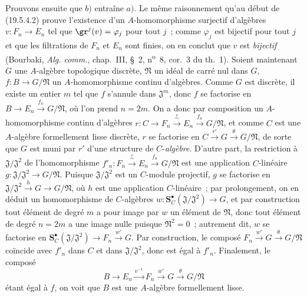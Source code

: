 \begin{env}[19.5.4.3]
\label{0.19.5.4.3-fr}
Prouvons ensuite que $b)$ entraîne $a)$. Le même raisonnement qu'au début de
(19.5.4.2) prouve l'existence d'un $A$-homomorphisme surjectif d'algèbres
$v:F_n\to E_n$ tel que $\gr^j(v)=\varphi_j$ pour tout $j$~; comme $\varphi_j$
est bijectif pour tout $j$ et que les filtrations de $F_n$ et $E_n$ sont
finies, on en conclut que $v$ est \emph{bijectif} (Bourbaki,
\emph{Alg. comm.}, chap.~III, §~2, n\textsuperscript{o}~8, cor.~3 du th.~1).
Soient maintenant $G$ une $A$-algèbre topologique discrète, $\mathfrak N$ un
idéal de carré nul dans $G$, $f:B\to G/\mathfrak N$ un $A$-homomorphisme
continu d'algèbres. Comme $G$ est discrète, il existe un entier $m$ tel que
$f$ s'annule dans $\mathfrak J^m$, donc $f$ se factorise en
$B\to E_n\xrightarrow{f_n}G/\mathfrak N$, où l'on prend $n=2m$. On a donc par
composition un $A$-homomorphisme continu d'algèbres
$r:C\to F_n\xrightarrow{\overset{v}{\sim}}E_n\xrightarrow{f_n}G/\mathfrak N$, et comme $C$
est une $A$-algèbre formellement lisse discrète, $r$ se factorise en
$C\xrightarrow{r'}G\xrightarrow{\theta}G/\mathfrak N$, de sorte que $G$ est muni par $r'$ d'une
structure de $C$-\emph{algèbre}. D'autre part, la restriction à
$\mathfrak J/\mathfrak J^2$ de l'homomorphisme
$f'_n:F_n\xrightarrow{\overset{v}{\sim}}E_n\xrightarrow{f_n}G/\mathfrak N$ est une application
$C$-linéaire $g:\mathfrak J/\mathfrak J^2\to G/\mathfrak N$. Puisque
$\mathfrak J/\mathfrak J^2$ est un $C$-module projectif, $g$ se factorise en
$\mathfrak J/\mathfrak J^2\xrightarrow{h}G\to G/\mathfrak N$, où $h$ est une
application $C$-linéaire~; par prolongement, on en déduit un homomorphisme de
$C$-algèbres $w:\mathbf S_C^\bullet(\mathfrak J/\mathfrak J^2)\to G$, et par
construction tout élément de degré $m$ a pour image par $w$ un élément de
$\mathfrak N$, donc tout élément de degré $n=2m$ a une image nulle puisque
$\mathfrak N^2=0$~; autrement dit, $w$ se factorise en
$\mathbf S_C^\bullet(\mathfrak J/\mathfrak J^2)\to F_n\xrightarrow{w'}G$. Par
construction, le composé $F_n\xrightarrow{w'}G\xrightarrow{\theta}G/\mathfrak N$
coïncide avec $f'_n$ dans $C$ et dans $\mathfrak J/\mathfrak J^2$, donc est
égal à $f'_n$. Finalement, le composé
\[
  B\to E_n\xrightarrow{v^{-1}}F_n\xrightarrow{w'}G\xrightarrow{\theta}G/\mathfrak N
\]
étant
égal à $f$, on voit que $B$ est une $A$-algèbre formellement lisse.
\end{env}

